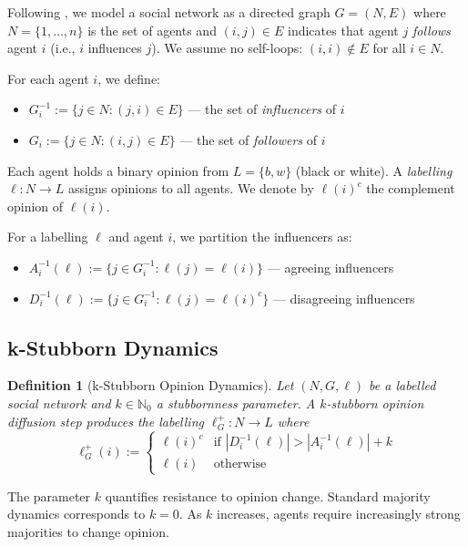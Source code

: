 \documentclass[conference]{IEEEtran}
\newtheorem{definition}{Definition}
\begin{document}
Following \cite{easley2010networks}, we model a social network as a directed graph $G = (N, E)$ where $N = \{1, \ldots, n\}$ is the set of agents and $(i,j) \in E$ indicates that agent $j$ \emph{follows} agent $i$ (i.e., $i$ influences $j$). We assume no self-loops: $(i,i) \notin E$ for all $i \in N$.

For each agent $i$, we define:
\begin{itemize}
\item $G_i^{-1} := \{j \in N : (j,i) \in E\}$ --- the set of \emph{influencers} of $i$
\item $G_i := \{j \in N : (i,j) \in E\}$ --- the set of \emph{followers} of $i$
\end{itemize}

Each agent holds a binary opinion from $L = \{b, w\}$ (black or white). A \emph{labelling} $\ell : N \to L$ assigns opinions to all agents. We denote by $\ell(i)^c$ the complement opinion of $\ell(i)$.

For a labelling $\ell$ and agent $i$, we partition the influencers as:
\begin{itemize}
\item $A_i^{-1}(\ell) := \{j \in G_i^{-1} : \ell(j) = \ell(i)\}$ --- agreeing influencers
\item $D_i^{-1}(\ell) := \{j \in G_i^{-1} : \ell(j) = \ell(i)^c\}$ --- disagreeing influencers
\end{itemize}

\subsection{k-Stubborn Dynamics}

\begin{definition}[k-Stubborn Opinion Dynamics]
\label{def:k_stubborn}
Let $(N, G, \ell)$ be a labelled social network and $k \in \mathbb{N}_0$ a stubbornness parameter. A \emph{$k$-stubborn opinion diffusion step} produces the labelling $\ell^+_G : N \to L$ where
\[
\ell^+_G(i) := \begin{cases}
\ell(i)^c & \text{if } |D_i^{-1}(\ell)| > |A_i^{-1}(\ell)| + k \\
\ell(i) & \text{otherwise}
\end{cases}
\]
\end{definition}

The parameter $k$ quantifies resistance to opinion change. Standard majority dynamics corresponds to $k=0$. As $k$ increases, agents require increasingly strong majorities to change opinion.
\end{document}
